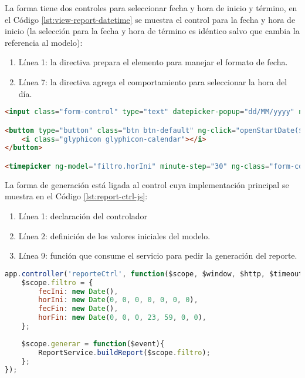 La forma tiene dos controles para seleccionar fecha y hora de inicio y término, en el Código \ref{lst:view-report-datetime} se muestra el control para la fecha y hora de inicio (la selección para la fecha y hora de término es idéntico salvo que cambia la referencia al modelo):
\begin{enumerate}
	\item Línea 1: la directiva  prepara el elemento para manejar el formato de fecha.
	\item Línea 7: la directiva  agrega el comportamiento para seleccionar la hora del día.
\end{enumerate}
\begin{lstlisting}[language=HTML, captionpos=b, caption={Controles para seleccionar fecha y hora en la generación de reportes.}, label={lst:view-report-datetime}]
<input class="form-control" type="text" datepicker-popup="dd/MM/yyyy" ng-model="filtro.fecIni" is-open="startDateOpen" ng-required="true" starting-day="1" />

<button type="button" class="btn btn-default" ng-click="openStartDate($event)">
	<i class="glyphicon glyphicon-calendar"></i>
</button>

<timepicker ng-model="filtro.horIni" minute-step="30" ng-class="form-control"></timepicker>
\end{lstlisting}

La forma de generación está ligada al control  cuya implementación principal se muestra en el Código \ref{lst:report-ctrl-js}:

\begin{enumerate}
	\item Línea 1: declaración del controlador
	\item Línea 2: definición de los valores iniciales del modelo.
	\item Línea 9: función que consume el servicio  para pedir la generación del reporte.
\end{enumerate}

\begin{lstlisting}[language=Javascript, caption={Servicio en AngularJS para pedir la generación de un reporte.}, captionpos=b, label={lst:report-ctrl-js}]
app.controller('reporteCtrl', function($scope, $window, $http, $timeout, ReportService){
	$scope.filtro = {
		fecIni: new Date(),
		horIni: new Date(0, 0, 0, 0, 0, 0, 0),
		fecFin: new Date(),
		horFin: new Date(0, 0, 0, 23, 59, 0, 0),
	};
	
	$scope.generar = function($event){
		ReportService.buildReport($scope.filtro);
	};
});
\end{lstlisting}

